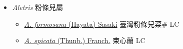 
  \begin{itemize}
 \item[] \textit{Aletris} 粉條兒屬
                    
  \begin{itemize}
        \item[] \href{http://www.theplantlist.org/tpl1.1/search?q=Aletris+formosana}{\textit{A. formosana} (Hayata) Sasaki}   臺灣粉條兒菜\# LC
        \item[] \href{http://www.theplantlist.org/tpl1.1/search?q=Aletris+spicata}{\textit{A. spicata} (Thunb.) Franch.}   束心蘭 LC
  \end{itemize}
  \end{itemize}

